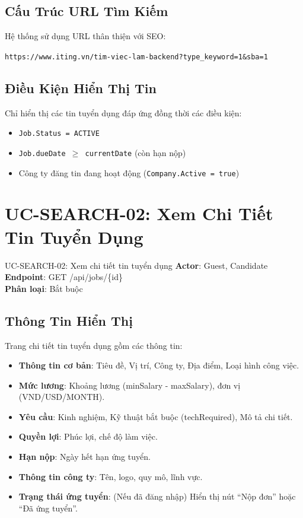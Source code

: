 \documentclass[12pt, a4paper]{report}
\begin{document}
\subsection{Cấu Trúc URL Tìm Kiếm}

Hệ thống sử dụng URL thân thiện với SEO:
\begin{center}
\texttt{https://www.iting.vn/tim-viec-lam-backend?type\_keyword=1\&sba=1}
\end{center}

\subsection{Điều Kiện Hiển Thị Tin}

Chỉ hiển thị các tin tuyển dụng đáp ứng đồng thời các điều kiện:
\begin{itemize}
    \item \texttt{Job.Status = ACTIVE}
    \item \texttt{Job.dueDate $\geq$ currentDate} (còn hạn nộp)
    \item Công ty đăng tin đang hoạt động (\texttt{Company.Active = true})
\end{itemize}

\section{UC-SEARCH-02: Xem Chi Tiết Tin Tuyển Dụng}

\begin{requirementbox}{UC-SEARCH-02: Xem chi tiết tin tuyển dụng}
\textbf{Actor}: Guest, Candidate \\
\textbf{Endpoint}: GET /api/jobs/\{id\} \\
\textbf{Phân loại}: Bắt buộc
\end{requirementbox}

\subsection{Thông Tin Hiển Thị}

Trang chi tiết tin tuyển dụng gồm các thông tin:

\begin{itemize}
    \item \textbf{Thông tin cơ bản}: Tiêu đề, Vị trí, Công ty, Địa điểm, Loại hình công việc.
    \item \textbf{Mức lương}: Khoảng lương (minSalary - maxSalary), đơn vị (VND/USD/MONTH).
    \item \textbf{Yêu cầu}: Kinh nghiệm, Kỹ thuật bắt buộc (techRequired), Mô tả chi tiết.
    \item \textbf{Quyền lợi}: Phúc lợi, chế độ làm việc.
    \item \textbf{Hạn nộp}: Ngày hết hạn ứng tuyển.
    \item \textbf{Thông tin công ty}: Tên, logo, quy mô, lĩnh vực.
    \item \textbf{Trạng thái ứng tuyển}: (Nếu đã đăng nhập) Hiển thị nút ``Nộp đơn'' hoặc ``Đã ứng tuyển''.
\end{itemize}
\end{document}
